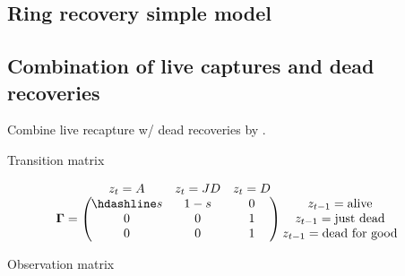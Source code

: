 \documentclass[
  12pt,
]{krantz}
\begin{document}
\hypertarget{ring-recovery-simple-model}{%
\subsection{Ring recovery simple model}\label{ring-recovery-simple-model}}

\hypertarget{combination-of-live-captures-and-dead-recoveries}{%
\subsection{Combination of live captures and dead recoveries}\label{combination-of-live-captures-and-dead-recoveries}}

Combine live recapture w/ dead recoveries by \citet{lebreton1999}.

Transition matrix

\[
\begin{matrix}
& \\
\mathbf{\Gamma} =
  \left ( \vphantom{ \begin{matrix} 12 \\ 12 \\ 12 \end{matrix} } \right .
          \end{matrix}
          \hspace{-1.2em}
          \begin{matrix}
          z_t=A & z_t=JD & z_t=D \\ \hdashline
          s & 1-s & 0\\
          0 & 0 & 1\\
          0 & 0 & 1
          \end{matrix}
          \hspace{-0.2em}
          \begin{matrix}
          & \\
          \left . \vphantom{ \begin{matrix} 12 \\ 12 \\ 12 \end{matrix} } \right )
\begin{matrix}
z_{t-1}=\text{alive} \\ z_{t-1}=\text{just dead} \\ z_{t-1}=\text{dead for good}
\end{matrix}
\end{matrix}
\]

Observation matrix
\end{document}
